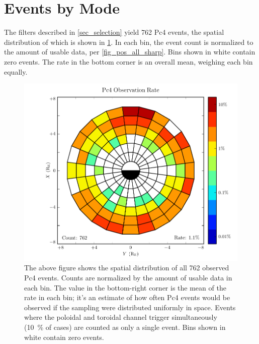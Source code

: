 \section{Events by Mode}
  \label{sec_rate}

The filters described in \cref{sec_selection} yield 762 Pc4 events, the spatial distribution of which is shown in \cref{fig_rate_all_sharp}. In each bin, the event count is normalized to the amount of usable data, per \cref{fig_pos_all_sharp}. Bins shown in white contain zero events. The rate in the bottom corner is an overall mean, weighing each bin equally. 


\begin{figure}[!htb]
    \centering
    \includegraphics[width=\textwidth]{figures/rate_all_sharp.pdf}
    \caption[Observation Rate of Pc4 Events]{
      The above figure shows the spatial distribution of all 762 observed Pc4 events. Counts are normalized by the amount of usable data in each bin. The value in the bottom-right corner is the mean of the rate in each bin; it's an estimate of how often Pc4 events would be observed if the sampling were distributed uniformly in space. Events where the poloidal and toroidal channel trigger simultaneously (\about\SI{10}{\percent} of cases) are counted as only a single event. Bins shown in white contain zero events. 
    }
    \label{fig_rate_all_sharp}
\end{figure}

